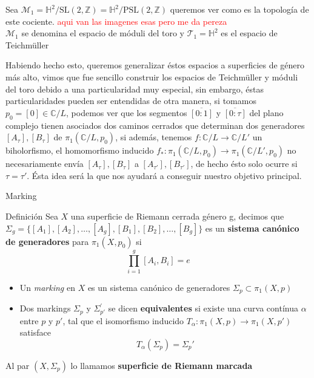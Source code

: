 \documentclass[xcolor=dvipsnames,10pt]{beamer}
\newcommand\Z{\ensuremath{\mathbb{Z}}}
\newcommand\C{\ensuremath{\mathbb{C}}}
\newcommand\Hs{\ensuremath{\mathbb{H}}}
\begin{document}
\begin{frame}
    Sea $\mathcal{M}_1 = \Hs^2/\text{SL}(2,\Z) = \Hs^2/\text{PSL}(2,\Z)$ queremos ver como es la topología de este cociente. \textcolor{red}{aqui van las imagenes esas pero me da pereza}\\ 
    $\mathcal{M}_1$ se denomina el espacio de móduli del toro y $\mathcal{T}_1 = \Hs^2 $ es el espacio de Teichmüller

\end{frame}
\begin{frame}
    Habiendo hecho esto, queremos generalizar éstos espacios a superficies de género más alto, vimos que fue sencillo construir los espacios de Teichmüller y móduli del toro debido a una particularidad muy especial, sin embargo, éstas particularidades pueden ser entendidas de otra manera, si tomamos $p_0 = [0] \in \C /L$, podemos ver que los segmentos $\overline{[0:1]}$ y $\overline{[0:\tau]}$ del plano complejo tienen asociados dos caminos cerrados que determinan dos generadores $[A_\tau],[B_\tau]$ de $\pi_1(\C /L,p_0)$, si además, tenemos $f: \C/L \rightarrow \C/L'$ un biholorfismo, el homomorfismo inducido $f_*: \pi_1(\C/L,p_0) \rightarrow \pi_1(\C/L', p_0)$ no necesariamente envía $[A_\tau],[B_\tau]$ a $[A_{\tau'}],[B_{\tau'}]$, de hecho ésto solo ocurre si $\tau = \tau'$. Ésta idea será la que nos ayudará a conseguir nuestro objetivo principal.  
\end{frame}
\begin{frame}{Marking}
    \begin{block}{Definición}
        Sea $X$ una superficie de Riemann cerrada género g,  decimos que $\Sigma_g = \{[A_1],[A_2],\ldots,[A_g],[B_1],[B_2],\ldots, [B_g]\}$ es un \textbf{sistema canónico de generadores} para $\pi_1(X,p_0)$ si
    \[ \prod_{i=1}^g [A_i,B_i] = e \]
    \begin{itemize}
        \item Un \textit{marking} en $X$ es un sistema canónico de generadores $\Sigma_p \subset \pi_1(X,p)$
        \item Dos markings $\Sigma_p$ y $\Sigma_{p'}^\prime$ se dicen  \textbf{equivalentes} si existe una curva contínua $\alpha$ entre $p$ y $p'$, tal que el isomorfismo inducido $T_\alpha: \pi_1(X,p) \rightarrow \pi_1(X,p')$ satisface
        \[
        T_\alpha(\Sigma_p) = \Sigma_p'
        \]
    \end{itemize}
    Al par $(X,\Sigma_p)$ lo llamamos \textbf{superficie de Riemann marcada} 
    \end{block}
    \end{frame}
\end{document}
